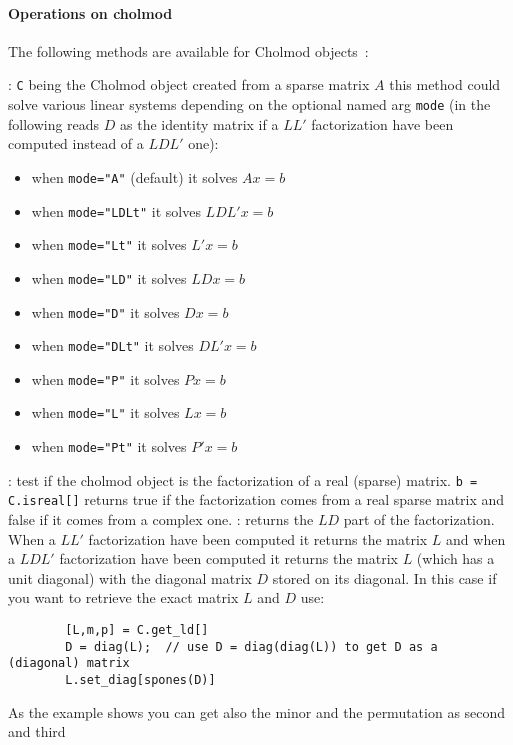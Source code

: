 \paragraph{Operations on cholmod}
The following methods are available for Cholmod objects~:
\begin{varlist}
  : \verb+C+ being the Cholmod object created from a sparse matrix $A$
  this method could solve various linear systems depending on the optional named arg \verb+mode+ (in the
  following reads $D$ as the identity matrix if a $LL'$ factorization have been computed instead of a  
  $LDL'$ one):
     \begin{itemize} 
        \item when \verb+mode="A"+ (default) it solves $Ax=b$ 
        \item when \verb+mode="LDLt"+ it solves $LDL' x = b$
        \item when \verb+mode="Lt"+ it solves $L' x = b$  
        \item when \verb+mode="LD"+ it solves $LD x = b$
        \item when \verb+mode="D"+ it solves $D x = b$
        \item when \verb+mode="DLt"+ it solves $DL' x = b$
        \item when \verb+mode="P"+ it solves $P x = b$
        \item when \verb+mode="L"+ it solves $L x = b$
        \item when \verb+mode="Pt"+ it solves $P' x = b$
     \end{itemize}
  : test if the cholmod object is the factorization of a real (sparse) matrix.
                  \verb+b = C.isreal[]+ returns true if the factorization comes from a real
                  sparse matrix and false if it comes from a complex one.
  : returns the $LD$ part of the factorization. When a $LL'$
        factorization have been computed  it returns the matrix $L$ and when a $LDL'$
        factorization have been computed it returns the matrix $L$ (which has a unit diagonal) with
        the diagonal matrix $D$ stored on its diagonal. In this case if you want to retrieve
        the exact matrix $L$ and $D$ use:
        \begin{Verbatim}
        [L,m,p] = C.get_ld[]
        D = diag(L);  // use D = diag(diag(L)) to get D as a (diagonal) matrix 
        L.set_diag[spones(D)]
        \end{Verbatim}
        As the example shows you can get also the minor and the permutation as second and third

\end{varlist}
